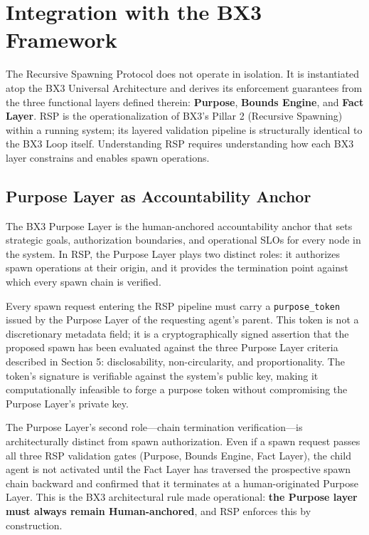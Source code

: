 \section{Integration with the BX3 Framework}

The Recursive Spawning Protocol does not operate in isolation. It is instantiated atop the BX3 Universal Architecture and derives its enforcement guarantees from the three functional layers defined therein: \textbf{Purpose}, \textbf{Bounds Engine}, and \textbf{Fact Layer}. RSP is the operationalization of BX3's Pillar 2 (Recursive Spawning) within a running system; its layered validation pipeline is structurally identical to the BX3 Loop itself. Understanding RSP requires understanding how each BX3 layer constrains and enables spawn operations.

\subsection{Purpose Layer as Accountability Anchor}

The BX3 Purpose Layer is the human-anchored accountability anchor that sets strategic goals, authorization boundaries, and operational SLOs for every node in the system. In RSP, the Purpose Layer plays two distinct roles: it authorizes spawn operations at their origin, and it provides the termination point against which every spawn chain is verified.

Every spawn request entering the RSP pipeline must carry a \texttt{purpose\_token} issued by the Purpose Layer of the requesting agent's parent. This token is not a discretionary metadata field; it is a cryptographically signed assertion that the proposed spawn has been evaluated against the three Purpose Layer criteria described in Section 5: disclosability, non-circularity, and proportionality. The token's signature is verifiable against the system's public key, making it computationally infeasible to forge a purpose token without compromising the Purpose Layer's private key.

The Purpose Layer's second role—chain termination verification—is architecturally distinct from spawn authorization. Even if a spawn request passes all three RSP validation gates (Purpose, Bounds Engine, Fact Layer), the child agent is not activated until the Fact Layer has traversed the prospective spawn chain backward and confirmed that it terminates at a human-originated Purpose Layer. This is the BX3 architectural rule made operational: \textbf{the Purpose layer must always remain Human-anchored}, and RSP enforces this by construction.

